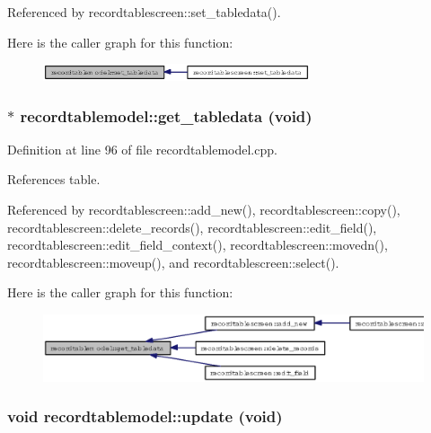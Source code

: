 Referenced by recordtablescreen::set\_\-tabledata().

Here is the caller graph for this function:\begin{figure}[H]
\begin{center}
\leavevmode
\includegraphics[width=223pt]{classrecordtablemodel_c7525d3fce71b4ad225169190141088f_icgraph}
\end{center}
\end{figure}
\subsubsection{ $\ast$ recordtablemodel::get\_\-tabledata (void)}\label{classrecordtablemodel_e3a0df4eed2846f73e7858e27ce3fdb6}




Definition at line 96 of file recordtablemodel.cpp.

References table.

Referenced by recordtablescreen::add\_\-new(), recordtablescreen::copy(), recordtablescreen::delete\_\-records(), recordtablescreen::edit\_\-field(), recordtablescreen::edit\_\-field\_\-context(), recordtablescreen::movedn(), recordtablescreen::moveup(), and recordtablescreen::select().

Here is the caller graph for this function:\begin{figure}[H]
\begin{center}
\leavevmode
\includegraphics[width=344pt]{classrecordtablemodel_e3a0df4eed2846f73e7858e27ce3fdb6_icgraph}
\end{center}
\end{figure}
\subsubsection{\setlength{\rightskip}{0pt plus 5cm}void recordtablemodel::update (void)}\label{classrecordtablemodel_e19a2f856cd1dda4f1955af3544ce482}




